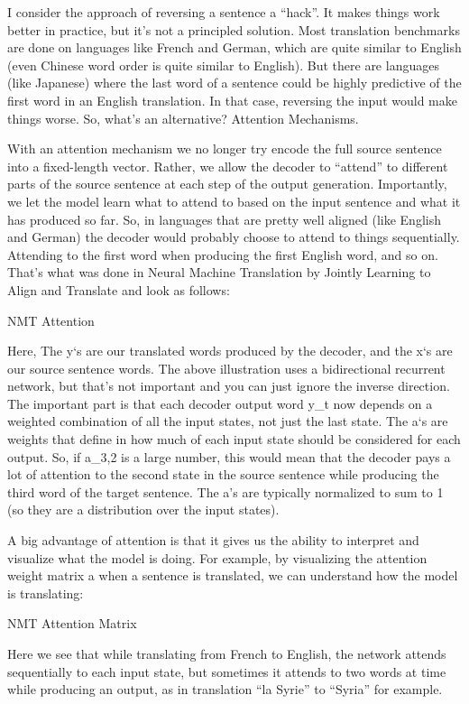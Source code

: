 I consider the approach of reversing a sentence a “hack”. It makes things work better in practice, but it’s not a principled solution. Most translation benchmarks are done on languages like French and German, which are quite similar to English (even Chinese word order is quite similar to English). But there are languages (like Japanese) where the last word of a sentence could be highly predictive of the first word in an English translation. In that case, reversing the input would make things worse. So, what’s an alternative? Attention Mechanisms.

With an attention mechanism we no longer try encode the full source sentence into a fixed-length vector. Rather, we allow the decoder to “attend” to different parts of the source sentence at each step of the output generation. Importantly, we let the model learn what to attend to based on the input sentence and what it has produced so far. So, in languages that are pretty well aligned (like English and German) the decoder would probably choose to attend to things sequentially. Attending to the first word when producing the first English word, and so on. That’s what was done in Neural Machine Translation by Jointly Learning to Align and Translate and look as follows:

NMT Attention

Here, The y‘s are our translated words produced by the decoder, and the x‘s are our source sentence words. The above illustration uses a bidirectional recurrent network, but that’s not important and you can just ignore the inverse direction. The important part is that each decoder output word y_t now depends on a weighted combination of all the input states, not just the last state. The a‘s are weights that define in how much of each input state should be considered for each output. So, if a_{3,2} is a large number, this would mean that the decoder pays a lot of attention to the second state in the source sentence while producing the third word of the target sentence. The a's are typically normalized to sum to 1 (so they are a distribution over the input states).

A big advantage of attention is that it gives us the ability to interpret and visualize what the model is doing. For example, by visualizing the attention weight matrix a when a sentence is translated, we can understand how the model is translating:

NMT Attention Matrix

Here we see that while translating from French to English, the network attends sequentially to each input state, but sometimes it attends to two words at time while producing an output, as in translation “la Syrie” to “Syria” for example.

